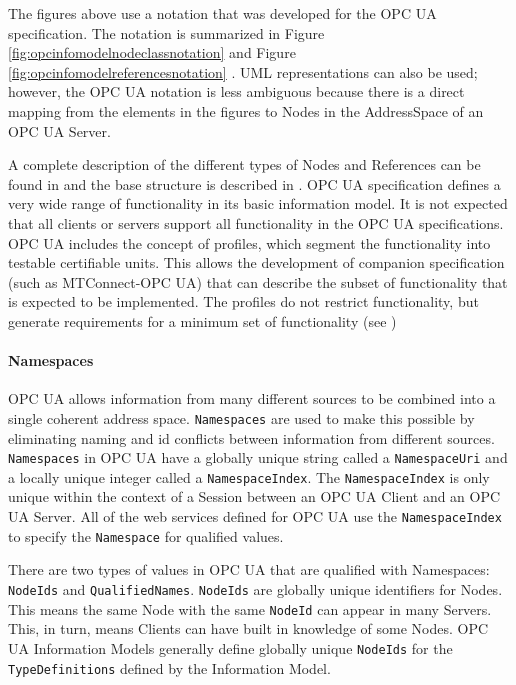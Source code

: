 
\FloatBarrier

The figures above use a notation that was developed for the OPC UA specification. The notation is summarized in Figure \ref{fig:opcinfomodelnodeclassnotation} and Figure \ref{fig:opcinfomodelreferencesnotation} . UML representations can also be used; however, the OPC UA notation is less ambiguous because there is a direct mapping from the elements in the figures to Nodes in the AddressSpace of an OPC UA Server.


\FloatBarrier

\FloatBarrier

A complete description of the different types of Nodes and References can be found in \cite{UAPart3} and the base structure is described in \cite{UAPart5}.
OPC UA specification defines a very wide range of functionality in its basic information model. It is not expected that all clients or servers support all functionality in the OPC UA specifications. OPC UA includes the concept of profiles, which segment the functionality into testable certifiable units. This allows the development of companion specification (such as MTConnect-OPC UA) that can describe the subset of functionality that is expected to be implemented. The profiles do not restrict functionality, but generate requirements for a minimum set of functionality (see \cite{UAPart7})


\paragraph{Namespaces}

OPC UA allows information from many different sources to be combined into a single coherent address space. \texttt{Namespaces} are used to make this possible by eliminating naming and id conflicts between information from different sources. \texttt{Namespaces} in OPC UA have a globally unique string called a \texttt{NamespaceUri} and a locally unique integer called a \texttt{NamespaceIndex}. The \texttt{NamespaceIndex} is only unique within the context of a Session between an OPC UA Client and an OPC UA Server. All of the web services defined for OPC UA use the \texttt{NamespaceIndex} to specify the \texttt{Namespace} for qualified values.

There are two types of values in OPC UA that are qualified with Namespaces: \texttt{NodeIds} and \texttt{QualifiedNames}. \texttt{NodeIds} are globally unique identifiers for Nodes. This means the same Node with the same \texttt{NodeId} can appear in many Servers. This, in turn, means Clients can have built in knowledge of some Nodes. OPC UA Information Models generally define globally unique \texttt{NodeIds} for the \texttt{TypeDefinitions} defined by the Information Model.

